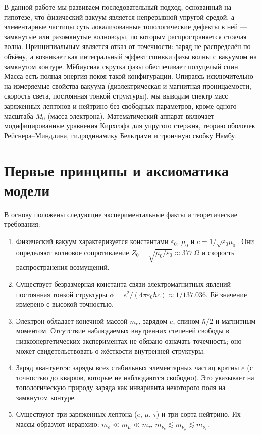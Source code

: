 \documentclass[12pt,a4paper]{article}
\begin{document}
	В данной работе мы развиваем последовательный подход, основанный на гипотезе, что физический вакуум является непрерывной упругой средой, а элементарные частицы суть локализованные топологические дефекты в ней — замкнутые или разомкнутые волноводы, по которым распространяется стоячая волна. Принципиальным является отказ от точечности: заряд не распределён по объёму, а возникает как интегральный эффект сшивки фазы волны с вакуумом на замкнутом контуре. Мёбиусная скрутка фазы обеспечивает полуцелый спин. Масса есть полная энергия покоя такой конфигурации. Опираясь исключительно на измеряемые свойства вакуума (диэлектрическая и магнитная проницаемости, скорость света, постоянная тонкой структуры), мы выводим спектр масс заряженных лептонов и нейтрино без свободных параметров, кроме одного масштаба $M_0$ (масса электрона). Математический аппарат включает модифицированные уравнения Кирхгофа для упругого стержня, теорию оболочек Рейснера–Миндлина, гидродинамику Бельтрами и троичную скобку Намбу.
	
	\section{Первые принципы и аксиоматика модели}
	В основу положены следующие экспериментальные факты и теоретические требования:
	\begin{enumerate}
		\item Физический вакуум характеризуется константами $\varepsilon_0$, $\mu_0$ и $c = 1/\sqrt{\varepsilon_0\mu_0}$. Они определяют волновое сопротивление $Z_0 = \sqrt{\mu_0/\varepsilon_0}\approx 377\,\Omega$ и скорость распространения возмущений.
		\item Существует безразмерная константа связи электромагнитных явлений — постоянная тонкой структуры $\alpha = e^2/(4\pi\varepsilon_0\hbar c) \approx 1/137.036$. Её значение измерено с высокой точностью.
		\item Электрон обладает конечной массой $m_e$, зарядом $e$, спином $\hbar/2$ и магнитным моментом. Отсутствие наблюдаемых внутренних степеней свободы в низкоэнергетических экспериментах не обязано означать точечность; оно может свидетельствовать о жёсткости внутренней структуры.
		\item Заряд квантуется: заряды всех стабильных элементарных частиц кратны $e$ (с точностью до кварков, которые не наблюдаются свободно). Это указывает на топологическую природу заряда как инварианта некоторого поля на замкнутом контуре.
		\item Существуют три заряженных лептона ($e$, $\mu$, $\tau$) и три сорта нейтрино. Их массы образуют иерархию: $m_e \ll m_\mu \ll m_\tau$, $m_{\nu_e} \lesssim m_{\nu_\mu} \lesssim m_{\nu_\tau}$.
	\end{enumerate}
	
\end{document}
